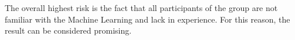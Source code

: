 The overall highest risk is the fact that all participants of the group are not familiar with the Machine Learning and lack in 
experience. For this reason, the result can be considered promising. 

%
%
%
%
%
%

